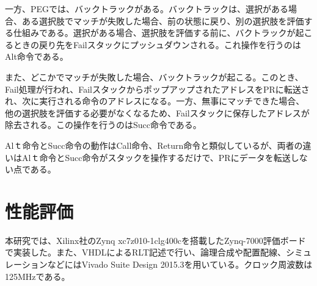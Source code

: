 \documentclass[submit]{ipsj}
\begin{document}




一方、PEGでは、バックトラックがある。バックトラックは、選択がある場合、ある選択肢でマッチが失敗した場合、前の状態に戻り、別の選択肢を評価する仕組みである。選択がある場合、選択肢を評価する前に、バクトラックが起こるときの戻り先をFailスタックにプッシュダウンされる。これ操作を行うのはAlt命令である。

また、どこかでマッチが失敗した場合、バックトラックが起こる。このとき、Fail処理が行われ、FailスタックからポップアップされたアドレスをPRに転送され、次に実行される命令のアドレスになる。一方、無事にマッチできた場合、他の選択肢を評価する必要がなくなるため、Failスタックに保存したアドレスが除去される。この操作を行うのはSucc命令である。

Alｔ命令とSucc命令の動作はCall命令、Return命令と類似しているが、両者の違いはAlｔ命令とSucc命令がスタックを操作するだけで、PRにデータを転送しない点である。



\section{性能評価}

本研究では、Xilinx社のZynq xc7z010-1clg400cを搭載したZynq-7000評価ボードで実装した。また、VHDLによるRLT記述で行い、論理合成や配置配線、シミュレーションなどにはVivado Suite Design 2015.3を用いている。クロック周波数は125MHzである。
\end{document}
